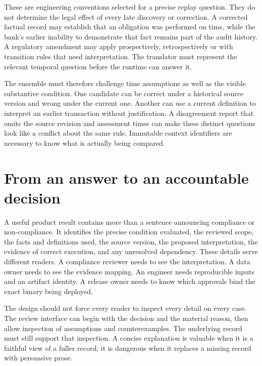 These are engineering conventions selected for a precise replay question. They
do not determine the legal effect of every late discovery or correction. A
corrected factual record may establish that an obligation was performed on time,
while the bank's earlier inability to demonstrate that fact remains part of the
audit history. A regulatory amendment may apply prospectively, retrospectively or
with transition rules that need interpretation. The translator must represent
the relevant temporal question before the runtime can answer it.

The ensemble must therefore challenge time assumptions as well as the visible
substantive condition. One candidate can be correct under a historical source
version and wrong under the current one. Another can use a current definition
to interpret an earlier transaction without justification. A disagreement report
that omits the source revision and assessment times can make these distinct
questions look like a conflict about the same rule. Immutable context identifiers
are necessary to know what is actually being compared.

\section{From an answer to an accountable decision}
\label{merge:M01:07}

\label{sec:problem-accountability}
A useful product result contains more than a sentence announcing compliance or
non-compliance. It identifies the precise condition evaluated, the reviewed scope,
the facts and definitions used, the source version, the proposed interpretation,
the evidence of correct execution, and any unresolved dependency. These details
serve different readers. A compliance reviewer needs to see the interpretation.
A data owner needs to see the evidence mapping. An engineer needs reproducible
inputs and an artifact identity. A release owner needs to know which approvals
bind the exact binary being deployed.

The design should not force every reader to inspect every detail on every case.
The review interface can begin with the decision and the material reason, then
allow inspection of assumptions and counterexamples. The underlying record must
still support that inspection. A concise explanation is valuable when it is a
faithful view of a fuller record; it is dangerous when it replaces a missing
record with persuasive prose.

